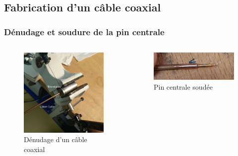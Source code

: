 \documentclass[10pt,a9paper,handout]{beamer} \usepackage[utf8]{inputenc} \usepackage[francais]{babel} \usepackage[T1]{fontenc}
\begin{document}
\subsection{Fabrication d'un câble coaxial}
\begin{frame}
\frametitle{Dénudage et soudure de la pin centrale}
\begin{columns}
\begin{column}{0.5\textwidth}
\begin{figure}[h]
    \begin{center}
        \includegraphics[width=\textwidth]{Images/Coax/1}
        \caption{Dénudage d'un câble coaxial}
    \end{center}
\end{figure}
\end{column}
\begin{column}{0.5\textwidth}
\begin{figure}[h]
    \begin{center}
        \includegraphics[width=\textwidth]{Images/Coax/3}
        \caption{Pin centrale soudée}
    \end{center}
\end{figure}
\end{column}
\end{columns}
\end{frame}
\end{document}
